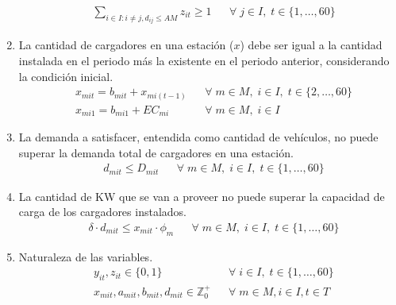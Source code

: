 \documentclass[letterpaper]{article}
\begin{document}
\begin{flushleft}
\begin{enumerate}
		      \begin{align*}
			       & \sum_{i \in I: i \neq j, d_{ij}\leq AM} z_{it} \geq 1 &  & \forall \; j \in I, \; t \in \{1, \ldots, 60\}
		      \end{align*}
		\item La cantidad de cargadores en una estaci\'on ($x$) debe ser igual a la cantidad instalada en el periodo más la existente en el periodo anterior, considerando la condici\'on inicial.
		      \begin{align*}
			       & x_{mit} = b_{mit} + x_{mi(t-1)} &  & \forall \; m \in M, \; i \in I, \; t \in \{2, \ldots, 60\} \\
			       & x_{mi1} = b_{mi1} + EC_{mi}     &  & \forall \; m \in M, \; i \in I
		      \end{align*}
		\item La demanda a satisfacer, entendida como cantidad de vehículos, no puede superar la demanda total de cargadores en una estación.
		      \begin{align*}
			       & d_{mit} \leq D_{mit} &  & \forall \; m \in M, \; i \in I, \; t \in \{1, \ldots, 60\}
		      \end{align*}
		\item La cantidad de KW que se van a proveer no puede superar la capacidad de carga de los cargadores instalados.
		      \begin{align*}
			       & \delta \cdot d_{mit} \leq x_{mit} \cdot \phi_m &  & \forall \; m \in M, \; i \in I, \; t \in \{1, \ldots, 60\}
		      \end{align*}
		\item Naturaleza de las variables.
		      \begin{align*}
			       & y_{it}, z_{it} \in \{0, 1\}                             &  & \forall \; i \in I, \; t \in \{1, \ldots, 60\} \\
			       & x_{mit}, a_{mit}, b_{mit}, d_{mit} \in \mathbb{Z}^{+}_0 &  & \forall \; m\in M, i\in I, t\in T
		      \end{align*}
	\end{enumerate}


\end{flushleft}
\end{document}
